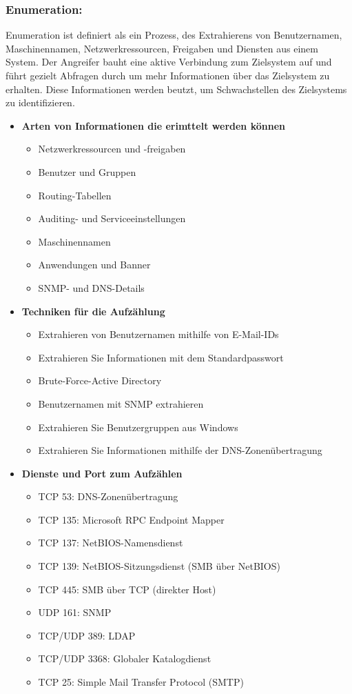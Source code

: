 \subsubsection{Enumeration:}
Enumeration ist definiert als ein Prozess, des Extrahierens von Benutzernamen, Maschinennamen, Netzwerkressourcen, Freigaben und Diensten aus einem System. Der Angreifer bauht eine aktive Verbindung zum Zielsystem auf und führt gezielt Abfragen durch um mehr Informationen über das Zielsystem zu erhalten. Diese Informationen werden beutzt, um Schwachstellen des Zielsystems zu identifizieren.\cite{ref_url17}
\begin{itemize}
    \item \textbf{Arten von Informationen die erimttelt werden können}
    \begin{itemize}
        \item Netzwerkressourcen und -freigaben 
        \item Benutzer und Gruppen 
        \item Routing-Tabellen 
        \item Auditing- und Serviceeinstellungen 
        \item Maschinennamen
        \item Anwendungen und Banner 
        \item SNMP- und DNS-Details 
    \end{itemize}\bigbreak
    \item \textbf{Techniken für die Aufzählung}
    \begin{itemize}
        \item Extrahieren von Benutzernamen mithilfe von E-Mail-IDs
        \item Extrahieren Sie Informationen mit dem Standardpasswort 
        \item Brute-Force-Active Directory
        \item Benutzernamen mit SNMP extrahieren 
        \item Extrahieren Sie Benutzergruppen aus Windows 
        \item Extrahieren Sie Informationen mithilfe der DNS-Zonenübertragung
    \end{itemize}\bigbreak
    \item \textbf{Dienste und Port zum Aufzählen} 
    \begin{itemize}
        \item TCP 53: DNS-Zonenübertragung 
        \item TCP 135: Microsoft RPC Endpoint Mapper 
        \item TCP 137: NetBIOS-Namensdienst 
        \item TCP 139: NetBIOS-Sitzungsdienst (SMB über NetBIOS) 
        \item TCP 445: SMB über TCP (direkter Host) 
        \item UDP 161: SNMP 
        \item TCP/UDP 389: LDAP 
        \item TCP/UDP 3368: Globaler Katalogdienst 
        \item TCP 25: Simple Mail Transfer Protocol (SMTP) 
    \end{itemize}
\end{itemize}\cite{ref_url17}

